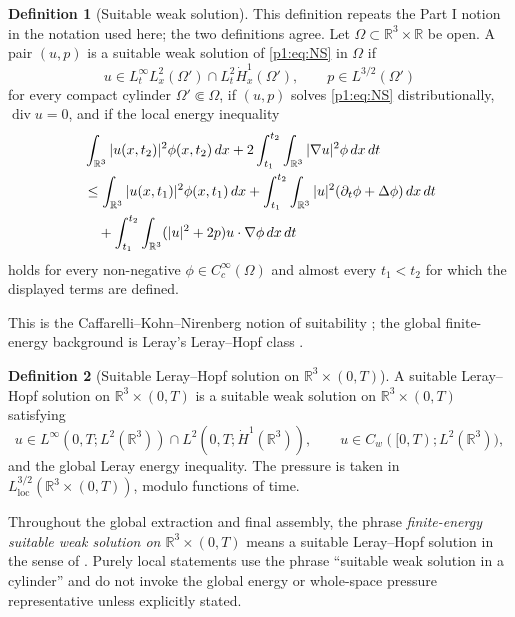 \documentclass[11pt]{amsart}
\theoremstyle{plain}
\theoremstyle{definition}
\newtheorem{definition}[definition]{Definition}
\theoremstyle{remark}
\numberwithin{equation}{section}
\newcommand{\R}{\mathbb R}
\newcommand{\loc}{\mathrm{loc}}
\newcommand{\divergence}{\operatorname{div}}
\begin{document}
\begin{definition}[Suitable weak solution]\label{p1:def:suitable}
This definition repeats the Part I notion in the notation used here; the two
definitions agree.
Let \(\Omega\subset\R^3\times\R\) be open.  A pair \((u,p)\) is a suitable
weak solution of \eqref{p1:eq:NS} in \(\Omega\) if
\[
   u\in L^\infty_tL^2_x(\Omega')\cap L^2_t\dot H^1_x(\Omega'),
   \qquad
   p\in L^{3/2}(\Omega')
\]
for every compact cylinder \(\Omega'\Subset\Omega\), if \((u,p)\) solves
\eqref{p1:eq:NS} distributionally, \(\divergence u=0\), and if the local energy
inequality
\begin{align}\label{p1:eq:lei}
   &\int_{\R^3}|u(x,t_2)|^2\phi(x,t_2)\,dx
   +2\int_{t_1}^{t_2}\int_{\R^3}|\nabla u|^2\phi\,dx\,dt  \notag\\
   &\le
   \int_{\R^3}|u(x,t_1)|^2\phi(x,t_1)\,dx
   +\int_{t_1}^{t_2}\int_{\R^3}|u|^2(\partial_t\phi+\Delta\phi)\,dx\,dt
   \notag\\
   &\quad
   +\int_{t_1}^{t_2}\int_{\R^3}(|u|^2+2p)u\cdot\nabla\phi\,dx\,dt
\end{align}
holds for every non-negative \(\phi\in C_c^\infty(\Omega)\) and almost every
\(t_1<t_2\) for which the displayed terms are defined.
\end{definition}

This is the Caffarelli--Kohn--Nirenberg notion of suitability
\cite{CKN1982}; the global finite-energy background is Leray's
Leray--Hopf class \cite{Leray1934}.

\begin{definition}[Suitable Leray--Hopf solution on \(\R^3\times(0,T)\)]
\label{p1:def:suitable-leray-hopf}
A suitable Leray--Hopf solution on \(\R^3\times(0,T)\) is a suitable weak
solution on \(\R^3\times(0,T)\) satisfying
\[
   u\in L^\infty(0,T;L^2(\R^3))
   \cap L^2(0,T;\dot H^1(\R^3)),
   \qquad
   u\in C_w([0,T);L^2(\R^3)),
\]
and the global Leray energy inequality.  The pressure is taken in
\(L^{3/2}_{\loc}(\R^3\times(0,T))\), modulo functions of time.
\end{definition}

Throughout the global extraction and final assembly, the phrase
\emph{finite-energy suitable weak solution on \(\R^3\times(0,T)\)} means a
suitable Leray--Hopf solution in the sense of
.  Purely local statements use the phrase
``suitable weak solution in a cylinder'' and do not invoke the global energy
or whole-space pressure representative unless explicitly stated.
\end{document}
